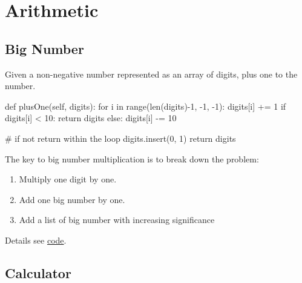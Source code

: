 \chapter{Arithmetic}


\section{Big Number}
 Given a non-negative number represented as an array of digits, plus one to the number.
\begin{python}
def plusOne(self, digits):
    for i in range(len(digits)-1, -1, -1):
        digits[i] += 1
        if digits[i] < 10:
            return digits
        else:
            digits[i] -= 10

    # if not return within the loop 
    digits.insert(0, 1)
    return digits
\end{python}

 The key to big number multiplication is to break down the problem:
\begin{enumerate}
\item Multiply one digit by one.
\item Add one big number by one.
\item Add a list of big number with increasing significance
\end{enumerate}
Details see \href{https://github.com/algorhythms/LeetCode/blob/master/042%20Multiply%20Strings.py}{code}.
\section{Calculator}
